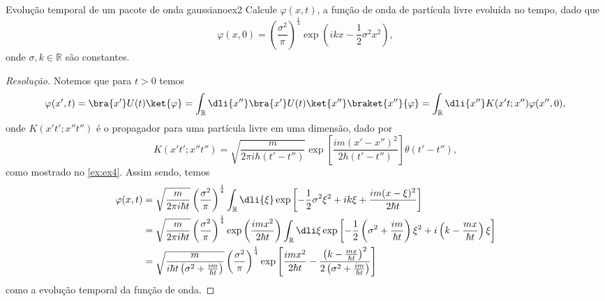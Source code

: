 \begin{exercício}{Evolução temporal de um pacote de onda gaussiano}{ex2}
   Calcule \(\varphi(x,t)\), a função de onda de partícula livre evoluída no tempo, dado que
   \begin{equation*}
      \varphi(x,0) = \left(\frac{\sigma^2}{\pi}\right)^{\frac14}\exp\left(ikx - \frac12 \sigma^2 x^2\right),
   \end{equation*}
   onde \(\sigma, k \in \mathbb{R}\) são constantes.
\end{exercício}
\begin{proof}[Resolução]
   Notemos que para \(t > 0\) temos
   \begin{equation*}
      \varphi(x', t) = \bra{x'} U(t) \ket{\varphi} = \int_{\mathbb{R}} \dli{x''} \bra{x'} U(t) \ket{x''} \braket{x''}{\varphi} = \int_{\mathbb{R}} \dli{x''} K(x't; x'') \varphi(x'', 0),
   \end{equation*}
   onde \(K(x't'; x'' t'')\) é o propagador para uma partícula livre em uma dimensão, dado por
   \begin{equation*}
      K(x't'; x'' t'') = \sqrt{\frac{m}{2\pi i \hbar (t' - t'')}} \exp\left[\frac{im (x' - x'')^2}{2 \hbar (t' - t'')}\right] \theta(t' - t''),
   \end{equation*}
   como mostrado no \cref{ex:ex4}. Assim sendo, temos
   \begin{align*}
      \varphi(x, t) &= \sqrt{\frac{m}{2\pi i \hbar t}} \left(\frac{\sigma^2}{\pi}\right)^{\frac14}\int_{\mathbb{R}} \dli{\xi} \exp\left[-\frac12 \sigma^2 \xi^2 + ik\xi + \frac{i m (x - \xi)^2}{2 \hbar t}\right]\\
                    &= \sqrt{\frac{m}{2\pi i \hbar t}} \left(\frac{\sigma^2}{\pi}\right)^{\frac14}\exp\left(\frac{im x^2}{ 2 \hbar t}\right) \int_{\mathbb{R}} \dli\xi \exp\left[- \frac12\left(\sigma^2 + \frac{im}{\hbar t}\right)\xi^2 + i\left(k - \frac{mx}{\hbar t}\right)\xi\right]\\
                    &= \sqrt{\frac{m}{i \hbar t\left(\sigma^2 + \frac{im}{\hbar t}\right)}} \left(\frac{\sigma^2}{\pi}\right)^{\frac14}\exp\left[\frac{im x^2}{ 2 \hbar t} - \frac{\left(k - \frac{mx}{\hbar t}\right)^2}{2\left(\sigma^2 + \frac{im}{\hbar t}\right)}\right]
   \end{align*}
   como a evolução temporal da função de onda.
\end{proof}
